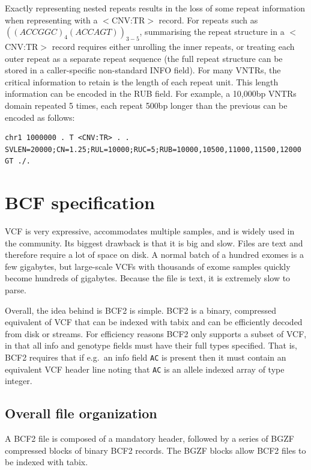 \documentclass[8pt]{article}
\begin{document}
Exactly representing nested repeats results in the loss of some repeat information when representing with a $<$CNV:TR$>$ record.
For repeats such as $((ACCGGC)_{4}(ACCAGT))_{3-5}$, summarising the repeat structure in a $<$CNV:TR$>$ record requires either unrolling the inner repeats, or treating each outer repeat as a separate repeat sequence (the full repeat structure can be stored in a caller-specific non-standard INFO field).
For many VNTRs, the critical information to retain is the length of each repeat unit.
This length information can be encoded in the RUB field.
For example, a 10,000bp VNTRs domain repeated 5 times, each repeat 500bp longer than the previous can be encoded as follows:

\footnotesize
\begin{verbatim}
chr1 1000000 . T <CNV:TR> . . SVLEN=20000;CN=1.25;RUL=10000;RUC=5;RUB=10000,10500,11000,11500,12000 GT ./.
\end{verbatim}
\normalsize




\pagebreak
\section{BCF specification}

VCF is very expressive, accommodates multiple samples, and is widely used in the community.
Its biggest drawback is that it is big and slow.
Files are text and therefore require a lot of space on disk.
A normal batch of a hundred exomes is a few gigabytes, but large-scale VCFs with thousands of exome samples quickly become hundreds of gigabytes.
Because the file is text, it is extremely slow to parse.

Overall, the idea behind is BCF2 is simple.
BCF2 is a binary, compressed equivalent of VCF that can be indexed with tabix and can be efficiently decoded from disk or streams.
For efficiency reasons BCF2 only supports a subset of VCF, in that all info and genotype fields must have their full types specified.
That is, BCF2 requires that if e.g.\ an info field {\tt AC} is present then it must contain an equivalent VCF header line noting that {\tt AC} is an allele indexed array of type integer.

\subsection{Overall file organization}

A BCF2 file is composed of a mandatory header, followed by a series of BGZF compressed blocks of binary BCF2 records.
The BGZF blocks allow BCF2 files to be indexed with tabix.
\end{document}
